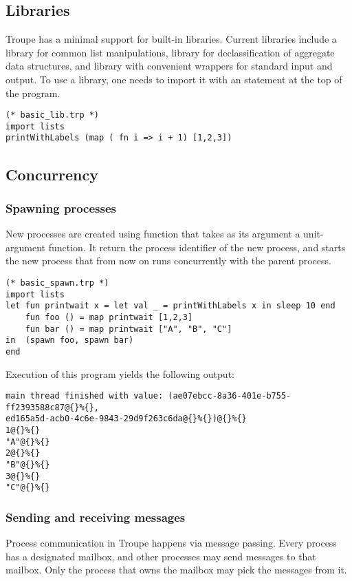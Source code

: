 \subsection{Libraries}
\label{sec:labels}
Troupe has a minimal support for built-in libraries. Current libraries include a library  for common list manipulations, library   for declassification of aggregate data structures, and library
 with convenient wrappers for standard input and output. To use a library, one needs to import it with an  statement at the top of the program.
\begin{lstlisting}
(* basic_lib.trp *)
import lists 
printWithLabels (map ( fn i => i + 1) [1,2,3])
\end{lstlisting}



\subsection{Concurrency} 
\label{sec:concurrency}
\subsubsection{Spawning processes}
New processes are created using  function that takes as its argument a unit-argument function. 
It return the process identifier of the new process, and starts the new process that from now on runs concurrently with the 
parent process.
\begin{lstlisting}
(* basic_spawn.trp *)
import lists
let fun printwait x = let val _ = printWithLabels x in sleep 10 end
    fun foo () = map printwait [1,2,3]
    fun bar () = map printwait ["A", "B", "C"]
in  (spawn foo, spawn bar)
end
\end{lstlisting}
Execution of this program yields the following output:
\begin{verbatim}
main thread finished with value: (ae07ebcc-8a36-401e-b755-ff2393588c87@{}%{}, 
ed165a5d-acb0-4c6e-9843-29d9f263c6da@{}%{})@{}%{}
1@{}%{}
"A"@{}%{}
2@{}%{}
"B"@{}%{}
3@{}%{}
"C"@{}%{}
\end{verbatim}

\subsubsection{Sending and receiving messages}
Process communication in Troupe happens via message passing.  Every process has a designated mailbox,
and other processes may send messages to that mailbox. Only the process that owns the mailbox may pick the messages from it.



